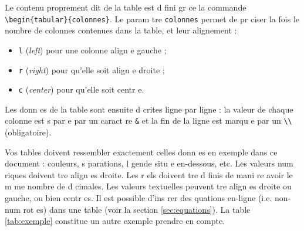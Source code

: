 \documentclass{article}
\begin{document}
Le contenu proprement dit de la table est d fini gr ce   la commande \texttt{\textbackslash{}begin\{tabular\}\{colonnes\}}. Le param tre \texttt{colonnes} permet de pr ciser   la fois le nombre de colonnes contenues dans la table, et leur alignement : 
\begin{itemize}
	\item \texttt{l} (\textit{left}) pour une colonne align e   gauche ;
	\item \texttt{r} (\textit{right}) pour qu'elle soit align e   droite ;
	\item \texttt{c} (\textit{center}) pour qu'elle soit centr e.
\end{itemize}

Les donn es de la table sont ensuite d crites ligne par ligne : la valeur de chaque colonne est s par e par un caract re \texttt{\&} et la fin de la ligne est marqu e par un \texttt{\textbackslash{}\textbackslash{}} (obligatoire).
	
Vos tables doivent ressembler exactement   celles donn es en exemple dans ce document : couleurs, s parations, l gende situ e en-dessous, etc. Les valeurs num riques doivent  tre align es   droite. Les r els doivent  tre d finis de mani re   avoir le m me nombre de d cimales. Les valeurs textuelles peuvent  tre align es   droite ou   gauche, ou bien centr es. Il est possible d'ins rer des  quations en-ligne (i\@.e\@. non-num rot es) dans une table (voir la section \ref{sec:equations}). La table \ref{tab:exemple} constitue un autre exemple   prendre en compte.
	
\end{document}

